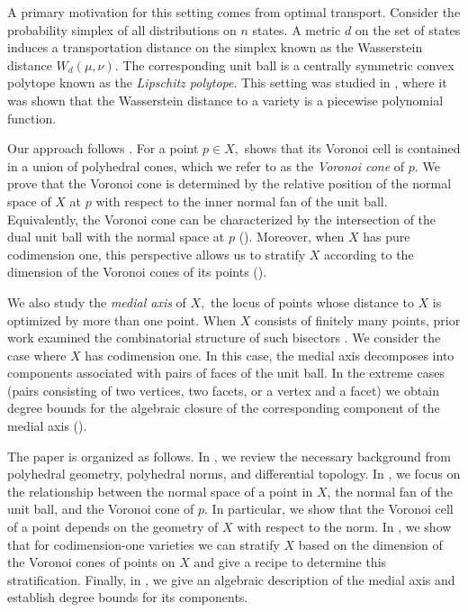 \documentclass{article}
\numberwithin{theorem}{section}
\theoremstyle{definition}
\theoremstyle{example_contd}
\begin{document}
     A primary motivation for this setting comes from optimal transport. Consider the probability simplex of all distributions on $n$ states. A metric $d$ on the set of states induces a transportation distance on the simplex known as the Wasserstein distance $W_d(\mu,\nu)$. The corresponding unit ball is a centrally symmetric convex polytope known as the \textit{Lipschitz polytope}. This setting was studied in \cite{CELIK_Optimal_transport,CELIK_Wasserstein}, where it was shown that the Wasserstein distance to a variety is a piecewise polynomial function.


     Our approach follows \cite{BECEDAS2024102229, CIFUENTES2022351}. For a point $p\in X,$ \cite{BECEDAS2024102229} shows that its Voronoi cell is contained in a union of polyhedral cones, which we refer to as the \textit{Voronoi cone} of $p.$ We prove that the Voronoi cone is determined by the relative position of the normal space of $X$ at $p$ with respect to the inner normal fan of the unit ball. Equivalently, the Voronoi cone can be characterized by the intersection of the dual unit ball with the normal space at $p$ (). Moreover, when $X$ has pure codimension one, this perspective allows us to stratify $X$ according to the dimension of the Voronoi cones of its points (). 

     We also study the \textit{medial axis} of $X,$ the locus of points whose distance to $X$ is optimized by more than one point. 
     When $X$ consists of finitely many points, prior work examined the combinatorial structure of such bisectors \cite{Criado,JalJochemko}. We consider the case where $X$ has codimension one.
     In this case, the medial axis decomposes into components associated with pairs of faces of the unit ball. In the extreme cases (pairs consisting of two vertices, two facets, or a vertex and a facet) we obtain degree bounds for the algebraic closure of the corresponding component of the medial axis ().
     
     The paper is organized as follows. In , we review the necessary background from polyhedral geometry, polyhedral norms, and differential topology. In , we focus on the relationship between the normal space of a point in $X$, the normal fan of the unit ball, and the Voronoi cone of $p$. In particular, we show that the Voronoi cell of a point depends on the geometry of $X$ with respect to the norm. In , we show that for codimension-one varieties we can stratify $X$ based on the dimension of the Voronoi cones of points on $X$ and give a recipe to determine this stratification. Finally, in , we give an algebraic description of the medial axis and establish degree bounds for its components.
     
\end{document}

